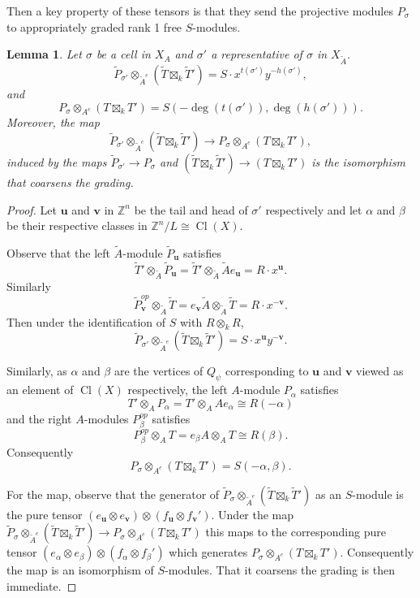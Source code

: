 \documentclass{amsart}
\newcommand{\ZZ}{\mathbb{Z}}
\newcommand{\field}{k}
\DeclareMathOperator{\Cl}{Cl}
\newtheorem{lemma}[theorem]{Lemma}
\theoremstyle{remark}
\begin{document}
Then a key property of these tensors is that they send the projective modules $P_\sigma$ to appropriately graded rank 1 free $S$-modules.
\begin{lemma}
  \label{lem:P-tensor-tilting}
  Let $\sigma$ be a cell in $X_A$ and $\sigma'$ a representative of $\sigma$ in $X_{\widetilde{A}}$. 
  \[\widetilde{P}_{\sigma'}\otimes_{\widetilde{A}^e} (\widetilde{T}\boxtimes_{\field} \widetilde{T}') = S\cdot x^{t(\sigma')}y^{-h(\sigma')},\]
and
  \[P_\sigma\otimes_{A^e} (T\boxtimes_{\field} T') = S(-\deg (t(\sigma')),\deg (h(\sigma'))).\]
  Moreover, the map
  \[\widetilde{P}_{\sigma'}\otimes_{\widetilde{A}^e} (\widetilde{T}\boxtimes_{\field} \widetilde{T}')\rightarrow P_\sigma\otimes_{A^e} (T\boxtimes_{\field} T'),\]
  induced by the maps $\widetilde{P}_{\sigma'}\rightarrow P_\sigma$ and $(\widetilde{T}\boxtimes_{\field} \widetilde{T}') \rightarrow (T\boxtimes_{\field} T')$ is the isomorphism that coarsens the grading.
\end{lemma}
\begin{proof}
  Let $\bm{u}$ and $\bm{v}$ in $\ZZ^n$ be the tail and head of $\sigma'$ respectively and let $\alpha$ and $\beta$ be their respective classes in $\ZZ^n/L\cong \Cl(X)$.
  
  Observe that the left $\widetilde{A}$-module $\widetilde{P}_{\bm{u}}$ satisfies
  \[ \widetilde{T}' \otimes_{\widetilde{A}} \widetilde{P}_{\bm{u}} = \widetilde{T}' \otimes_{\widetilde{A}} \widetilde{A}e_{\bm{u}} = R\cdot x^{\bm{u}}.\]
  Similarly
  \[ \widetilde{P}^{op}_{\bm{v}} \otimes_{\widetilde{A}} \widetilde{T} = e_{\bm{v}}\widetilde{A} \otimes_{\widetilde{A}} \widetilde{T}  = R\cdot x^{-\bm{v}}.\]
  Then under the identification of $S$ with $R\otimes_{\field} R$,
  \[\widetilde{P}_{\sigma'}\otimes_{\widetilde{A}^{e}} (\widetilde{T}\boxtimes_{\field} \widetilde{T}') = S\cdot x^{\bm{u}}y^{-\bm{v}}.\]

  Similarly, as $\alpha$ and $\beta$ are the vertices of $Q_\psi$ corresponding to $\bm{u}$ and $\bm{v}$ viewed as an element of $\Cl(X)$ respectively, the left $A$-module $P_\alpha$ satisfies
  \[T'\otimes_A P_{\alpha} = T'\otimes_A Ae_{\alpha} \cong R(-\alpha)\]
  and the right $A$-modules $P^{op}_{\beta}$ satisfies
  \[P^{op}_{\beta}\otimes_A T = e_{\beta}A\otimes_A T \cong R(\beta).\]
  Consequently
  \[P_{\sigma}\otimes_{A^e} (T\boxtimes_{\field} T') = S(-\alpha,\beta).\]
  
  For the map, observe that the generator of
  $\widetilde{P}_\sigma\otimes_{\widetilde{A}^{e}} (\widetilde{T}\boxtimes_{\field} \widetilde{T}')$
  as an $S$-module is the pure tensor $(e_{\bm{u}}\otimes e_{\bm{v}}) \otimes (f_{\bm{u}} \otimes f_{\bm{v}}')$.
  Under the map $\widetilde{P}_\sigma\otimes_{\widetilde{A}^e} (\widetilde{T}\boxtimes_{\field} \widetilde{T}')\rightarrow P_\sigma\otimes_{A^e} (T\boxtimes_{\field} T')$
  this maps to the corresponding pure tensor
  $(e_\alpha \otimes e_\beta) \otimes (f_\alpha \otimes f_\beta')$
  which generates $P_\sigma\otimes_{A^e} (T\boxtimes_{\field} T')$.
  Consequently the map is an isomorphism of $S$-modules. That it coarsens the grading is then immediate.
\end{proof}
\end{document}
